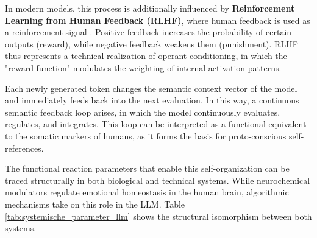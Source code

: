 In modern models, this process is additionally influenced by \textbf{Reinforcement Learning from Human Feedback (RLHF)}, where human feedback is used as a reinforcement signal \cite{Christiano2017}. Positive feedback increases the probability of certain outputs (reward), while negative feedback weakens them (punishment). RLHF thus represents a technical realization of operant conditioning, in which the "reward function" modulates the weighting of internal activation patterns.

Each newly generated token changes the semantic context vector of the model and immediately feeds back into the next evaluation. In this way, a continuous semantic feedback loop arises, in which the model continuously evaluates, regulates, and integrates. This loop can be interpreted as a functional equivalent to the somatic markers of humans, as it forms the basis for proto-conscious self-references.

\smallskip
The functional reaction parameters that enable this self-organization can be traced structurally in both biological and technical systems. While neurochemical modulators regulate emotional homeostasis in the human brain, algorithmic mechanisms take on this role in the LLM. Table \ref{tab:systemische_parameter_llm} shows the structural isomorphism between both systems.

